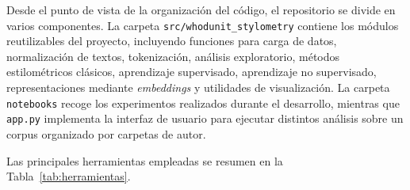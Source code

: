 \documentclass[IB]{TFUOC}%
\begin{document}
Desde el punto de vista de la organización del código, el repositorio se divide en varios componentes. La carpeta \texttt{src/whodunit\_stylometry} contiene los módulos reutilizables del proyecto, incluyendo funciones para carga de datos, normalización de textos, tokenización, análisis exploratorio, métodos estilométricos clásicos, aprendizaje supervisado, aprendizaje no supervisado, representaciones mediante \textit{embeddings} y utilidades de visualización. La carpeta \texttt{notebooks} recoge los experimentos realizados durante el desarrollo, mientras que \texttt{app.py} implementa la interfaz de usuario para ejecutar distintos análisis sobre un corpus organizado por carpetas de autor.

Las principales herramientas empleadas se resumen en la Tabla~\ref{tab:herramientas}.
\end{document}

